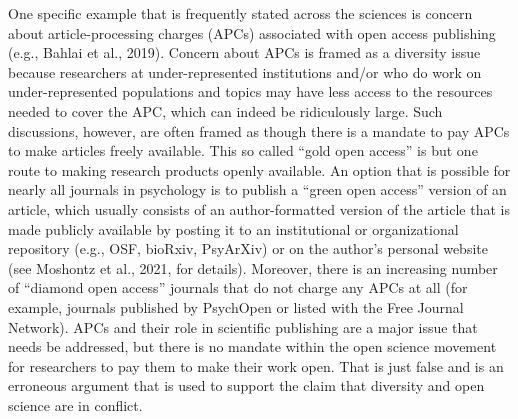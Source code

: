 \documentclass[authordate, empirical,issue]{jote-new-article}
\begin{document}
One specific example that is frequently stated across the sciences is concern about article-processing charges (APCs) associated with open access publishing (e.g., Bahlai et al., 2019). Concern about APCs is framed as a diversity issue because researchers at under-represented institutions and/or who do work on under-represented populations and topics may have less access to the resources needed to cover the APC, which can indeed be ridiculously large. Such discussions, however, are often framed as though there is a mandate to pay APCs to make articles freely available. This so called “gold open access” is but one route to making research products openly available. An option that is possible for nearly all journals in psychology is to publish a “green open access” version of an article, which usually consists of an author-formatted version of the article that is made publicly available by posting it to an institutional or organizational repository (e.g., OSF, bioRxiv, PsyArXiv) or on the author's personal website (see Moshontz et al., 2021, for details). Moreover, there is an increasing number of “diamond open access” journals that do not charge any APCs at all (for example, journals published by PsychOpen or listed with the Free Journal Network). APCs and their role in scientific publishing are a major issue that needs be addressed, but there is no mandate within the open science movement for researchers to pay them to make their work open. That is just false and is an erroneous argument that is used to support the claim that diversity and open science are in conflict.
\end{document}
